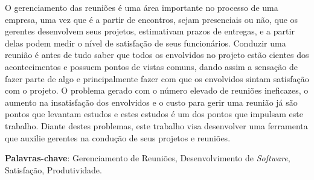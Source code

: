 \begin{resumo}

O gerenciamento das reuniões é uma área importante no processo de uma empresa, uma vez que é a partir de encontros, sejam presenciais ou não, que os gerentes  desenvolvem seus projetos, estimativam prazos de entregas, e a partir delas podem medir o nível de satisfação de seus funcionários. Conduzir uma reunião é antes de tudo saber que todos os envolvidos no projeto estão cientes dos acontecimentos e possuem pontos de vistas comuns, dando assim a sensação de fazer parte de algo e principalmente fazer com que os envolvidos sintam satisfação com o projeto. O problema gerado com o número elevado de reuniões ineficazes, o aumento na insatisfação dos envolvidos e o custo para gerir uma reunião já são pontos que levantam estudos e estes estudos é um dos pontos que impulsam este trabalho. Diante destes problemas, este trabalho visa desenvolver uma ferramenta que auxilie gerentes na condução de seus projetos e reuniões. 

 \vspace{\onelineskip}

 \noindent
 \textbf{Palavras-chave}: Gerenciamento de Reuniões, Desenvolvimento de \textit{Software}, Satisfação, Produtividade.
\end{resumo}
